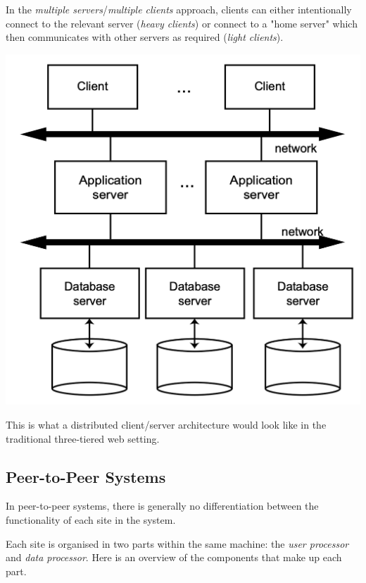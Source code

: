 \documentclass[12pt]{article}
\begin{document}
In the \textit{multiple servers}/\textit{multiple clients} approach, clients can either intentionally connect to the relevant server (\textit{heavy clients}) or connect to a "home server" which then communicates with other servers as required (\textit{light clients}).

\includegraphics[scale=0.5, center]{assets/distributed-client-server-overview.png}

This is what a distributed client/server architecture would look like in the traditional three-tiered web setting.

\subsection{Peer-to-Peer Systems}

In peer-to-peer systems, there is generally no differentiation between the functionality of each site in the system.

Each site is organised in two parts within the same machine: the \textit{user processor} and \textit{data processor}. Here is an overview of the components that make up each part.
\end{document}
